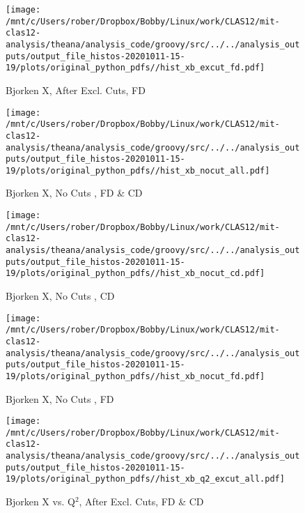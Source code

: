\documentclass{article}
\begin{document}
\begin{landscape}
    \begin{figure}[h]
        \centering

        \texttt{[image: /mnt/c/Users/rober/Dropbox/Bobby/Linux/work/CLAS12/mit-clas12-analysis/theana/analysis\_code/groovy/src/../../analysis\_outputs/output\_file\_histos-20201011-15-19/plots/original\_python\_pdfs//hist\_xb\_excut\_fd.pdf]}
        \captionsetup{textformat=empty,labelformat=blank}
        \caption{Bjorken X, After Excl. Cuts, FD}
    \end{figure}
    \clearpage
    
    \begin{figure}[h]
        \centering

        \texttt{[image: /mnt/c/Users/rober/Dropbox/Bobby/Linux/work/CLAS12/mit-clas12-analysis/theana/analysis\_code/groovy/src/../../analysis\_outputs/output\_file\_histos-20201011-15-19/plots/original\_python\_pdfs//hist\_xb\_nocut\_all.pdf]}
        \captionsetup{textformat=empty,labelformat=blank}
        \caption{Bjorken X, No Cuts , FD \& CD}
    \end{figure}
    \clearpage
    
    \begin{figure}[h]
        \centering

        \texttt{[image: /mnt/c/Users/rober/Dropbox/Bobby/Linux/work/CLAS12/mit-clas12-analysis/theana/analysis\_code/groovy/src/../../analysis\_outputs/output\_file\_histos-20201011-15-19/plots/original\_python\_pdfs//hist\_xb\_nocut\_cd.pdf]}
        \captionsetup{textformat=empty,labelformat=blank}
        \caption{Bjorken X, No Cuts , CD}
    \end{figure}
    \clearpage
    
    \begin{figure}[h]
        \centering

        \texttt{[image: /mnt/c/Users/rober/Dropbox/Bobby/Linux/work/CLAS12/mit-clas12-analysis/theana/analysis\_code/groovy/src/../../analysis\_outputs/output\_file\_histos-20201011-15-19/plots/original\_python\_pdfs//hist\_xb\_nocut\_fd.pdf]}
        \captionsetup{textformat=empty,labelformat=blank}
        \caption{Bjorken X, No Cuts , FD}
    \end{figure}
    \clearpage
    
    \begin{figure}[h]
        \centering

        \texttt{[image: /mnt/c/Users/rober/Dropbox/Bobby/Linux/work/CLAS12/mit-clas12-analysis/theana/analysis\_code/groovy/src/../../analysis\_outputs/output\_file\_histos-20201011-15-19/plots/original\_python\_pdfs//hist\_xb\_q2\_excut\_all.pdf]}
        \captionsetup{textformat=empty,labelformat=blank}
        \caption{Bjorken X vs. Q$^{2}$, After Excl. Cuts, FD \& CD}
    \end{figure}
    \clearpage
    

\end{landscape}
\end{document}
